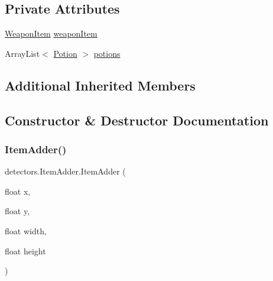 \subsection*{Private Attributes}
\begin{DoxyCompactItemize}
\item 
\mbox{\hyperlink{classitems_1_1_weapon_item}{Weapon\+Item}} \mbox{\hyperlink{classdetectors_1_1_item_adder_ac322ec31bdcfdcc3039e8d0ecc8d530f}{weapon\+Item}}
\item 
Array\+List$<$ \mbox{\hyperlink{classitems_1_1_potion}{Potion}} $>$ \mbox{\hyperlink{classdetectors_1_1_item_adder_a26e510502039e2245428cf040fafbd9c}{potions}}
\end{DoxyCompactItemize}
\subsection*{Additional Inherited Members}


\subsection{Constructor \& Destructor Documentation}
\mbox{\label{classdetectors_1_1_item_adder_af4b3e0a665b216da9f79393848081355}} 
\subsubsection{\texorpdfstring{Item\+Adder()}{ItemAdder()}\hspace{0.1cm}{\footnotesize\ttfamily [1/2]}}
{\footnotesize\ttfamily detectors.\+Item\+Adder.\+Item\+Adder (\begin{DoxyParamCaption}\item[{float}]{x,  }\item[{float}]{y,  }\item[{float}]{width,  }\item[{float}]{height }\end{DoxyParamCaption})\hspace{0.3cm}{\ttfamily [inline]}}


